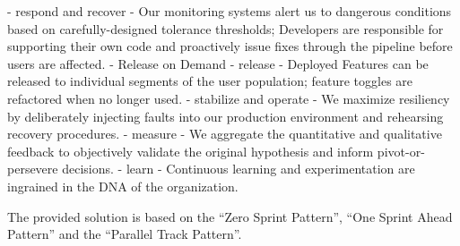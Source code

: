   - respond and recover
    - Our monitoring systems alert us to dangerous conditions based on carefully-designed tolerance thresholds; Developers are responsible for supporting their own code and proactively issue fixes through the pipeline before users are affected.
- Release on Demand
  - release
    - Deployed Features can be released to individual segments of the user population; feature toggles are refactored when no longer used.
  - stabilize and operate
    - We maximize resiliency by deliberately injecting faults into our production environment and rehearsing recovery procedures.
  - measure
    - We aggregate the quantitative and qualitative feedback to objectively validate the original hypothesis and inform pivot-or- persevere decisions.
  - learn
    - Continuous learning and experimentation are ingrained in the DNA of the organization.
\citep{HumanCen72:online}

The provided solution is based on the “Zero Sprint Pattern”, “One Sprint Ahead Pattern” and the “Parallel Track Pattern”.
\citep{Forbrig2015ManagingTA}

